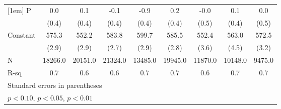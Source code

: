\begin{table}[htbp]
\begin{tabular}{l*{8}{c}}
[1em]
P                   &         0.0         &         0.1         &        -0.1         &        -0.9\sym{**} &         0.2         &        -0.0         &         0.1         &         0.0         \\
                    &       (0.4)         &       (0.4)         &       (0.4)         &       (0.4)         &       (0.4)         &       (0.5)         &       (0.4)         &       (0.5)         \\
[1em]
Constant            &       575.3\sym{***}&       552.2\sym{***}&       583.8\sym{***}&       599.7\sym{***}&       585.5\sym{***}&       552.4\sym{***}&       563.0\sym{***}&       572.5\sym{***}\\
                    &       (2.9)         &       (2.9)         &       (2.7)         &       (2.9)         &       (2.8)         &       (3.6)         &       (4.5)         &       (3.2)         \\
\hline
N                   &     18266.0         &     20151.0         &     21324.0         &     13485.0         &     19945.0         &     11870.0         &     10148.0         &      9475.0         \\
R-sq                &         0.7         &         0.6         &         0.6         &         0.7         &         0.7         &         0.6         &         0.7         &         0.7         \\
\hline\hline
\multicolumn{9}{l}{\footnotesize Standard errors in parentheses}\\
\multicolumn{9}{l}{\footnotesize \sym{*} \(p<0.10\), \sym{**} \(p<0.05\), \sym{***} \(p<0.01\)}\\
\end{tabular}
\end{table}
